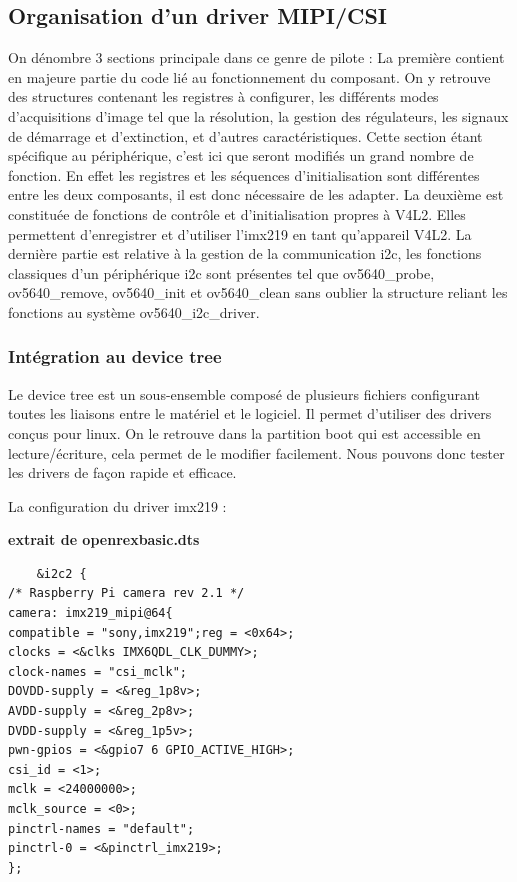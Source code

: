 {\subsection{Organisation d'un driver MIPI/CSI}

On dénombre 3 sections principale dans ce genre de pilote :
La première contient en majeure partie du code lié au fonctionnement du composant. On y
retrouve des structures contenant les registres à configurer, les différents modes
d’acquisitions d’image tel que la résolution, la gestion des régulateurs, les signaux de
démarrage et d’extinction, et d’autres caractéristiques. Cette section étant spécifique au
périphérique, c’est ici que seront modifiés un grand nombre de fonction. En effet les
registres et les séquences d’initialisation sont différentes entre les deux composants, il est
donc nécessaire de les adapter.
La deuxième est constituée de fonctions de contrôle et d’initialisation propres à V4L2.
Elles permettent d’enregistrer et d’utiliser l’imx219 en tant qu’appareil V4L2.
La dernière partie est relative à la gestion de la communication i2c, les fonctions
classiques d’un périphérique i2c sont présentes tel que ov5640\_probe, ov5640\_remove,
ov5640\_init et ov5640\_clean sans oublier la structure reliant les fonctions au système
ov5640\_i2c\_driver.

\subsubsection{Intégration au device tree}

Le device tree est un sous-ensemble composé de plusieurs fichiers configurant toutes les
liaisons entre le matériel et le logiciel. Il permet d’utiliser des drivers conçus pour linux. On
le retrouve dans la partition boot qui est accessible en lecture/écriture, cela permet de le
modifier facilement. Nous pouvons donc tester les drivers de façon rapide et efficace.

La configuration du driver imx219 :

\textbf{extrait de openrexbasic.dts}

\begin{lstlisting}
    &i2c2 {
/* Raspberry Pi camera rev 2.1 */
camera: imx219_mipi@64{
compatible = "sony,imx219";reg = <0x64>;
clocks = <&clks IMX6QDL_CLK_DUMMY>;
clock-names = "csi_mclk";
DOVDD-supply = <&reg_1p8v>;
AVDD-supply = <&reg_2p8v>;
DVDD-supply = <&reg_1p5v>;
pwn-gpios = <&gpio7 6 GPIO_ACTIVE_HIGH>;
csi_id = <1>;
mclk = <24000000>;
mclk_source = <0>;
pinctrl-names = "default";
pinctrl-0 = <&pinctrl_imx219>;
};
\end{lstlisting}

}
